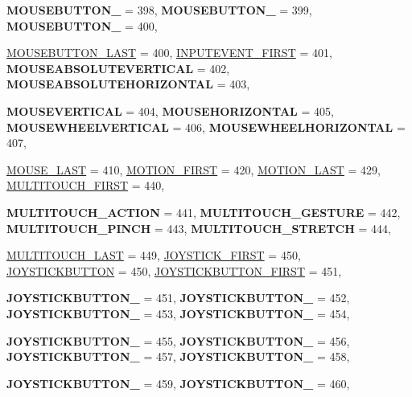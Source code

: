 \begin{DoxyCompactItemize}
{\bfseries MOUSEBUTTON\_} =  398, 
{\bfseries MOUSEBUTTON\_} =  399, 
{\bfseries MOUSEBUTTON\_} =  400, 
\par
\hyperlink{classMezzanine_1_1MetaCode_a3b5633f0145bf3287cf53a3f05b5563cafe382fb24be6c69c61306cbbabcfe951}{MOUSEBUTTON\_\-LAST} =  400, 
\hyperlink{classMezzanine_1_1MetaCode_a3b5633f0145bf3287cf53a3f05b5563cadc10438a6c168ceb32f8ec48147c1afe}{INPUTEVENT\_\-FIRST} =  401, 
{\bfseries MOUSEABSOLUTEVERTICAL} =  402, 
{\bfseries MOUSEABSOLUTEHORIZONTAL} =  403, 
\par
{\bfseries MOUSEVERTICAL} =  404, 
{\bfseries MOUSEHORIZONTAL} =  405, 
{\bfseries MOUSEWHEELVERTICAL} =  406, 
{\bfseries MOUSEWHEELHORIZONTAL} =  407, 
\par
\hyperlink{classMezzanine_1_1MetaCode_a3b5633f0145bf3287cf53a3f05b5563cae392d3b3b8fc8121444396b512af78b1}{MOUSE\_\-LAST} =  410, 
\hyperlink{classMezzanine_1_1MetaCode_a3b5633f0145bf3287cf53a3f05b5563ca5ca5a4e1047107db16891a7b8e7c3e7f}{MOTION\_\-FIRST} =  420, 
\hyperlink{classMezzanine_1_1MetaCode_a3b5633f0145bf3287cf53a3f05b5563ca4bb1bbeadf8a9ce608f145e84dfe2580}{MOTION\_\-LAST} =  429, 
\hyperlink{classMezzanine_1_1MetaCode_a3b5633f0145bf3287cf53a3f05b5563ca47639df435a26add473a23149c4b03a4}{MULTITOUCH\_\-FIRST} =  440, 
\par
{\bfseries MULTITOUCH\_\-ACTION} =  441, 
{\bfseries MULTITOUCH\_\-GESTURE} =  442, 
{\bfseries MULTITOUCH\_\-PINCH} =  443, 
{\bfseries MULTITOUCH\_\-STRETCH} =  444, 
\par
\hyperlink{classMezzanine_1_1MetaCode_a3b5633f0145bf3287cf53a3f05b5563cadafb9bea21b5f011c41d7dc5d76a113a}{MULTITOUCH\_\-LAST} =  449, 
\hyperlink{classMezzanine_1_1MetaCode_a3b5633f0145bf3287cf53a3f05b5563ca0ebb033c3b07eea557404351e66b5b20}{JOYSTICK\_\-FIRST} =  450, 
\hyperlink{classMezzanine_1_1MetaCode_a3b5633f0145bf3287cf53a3f05b5563ca1ffe2801d9d442c9bc8984380c3f4c38}{JOYSTICKBUTTON} =  450, 
\hyperlink{classMezzanine_1_1MetaCode_a3b5633f0145bf3287cf53a3f05b5563ca7f8a70b6fb33213356b435d5983ab025}{JOYSTICKBUTTON\_\-FIRST} =  451, 
\par
{\bfseries JOYSTICKBUTTON\_} =  451, 
{\bfseries JOYSTICKBUTTON\_} =  452, 
{\bfseries JOYSTICKBUTTON\_} =  453, 
{\bfseries JOYSTICKBUTTON\_} =  454, 
\par
{\bfseries JOYSTICKBUTTON\_} =  455, 
{\bfseries JOYSTICKBUTTON\_} =  456, 
{\bfseries JOYSTICKBUTTON\_} =  457, 
{\bfseries JOYSTICKBUTTON\_} =  458, 
\par
{\bfseries JOYSTICKBUTTON\_} =  459, 
{\bfseries JOYSTICKBUTTON\_} =  460, 

\end{DoxyCompactItemize}
